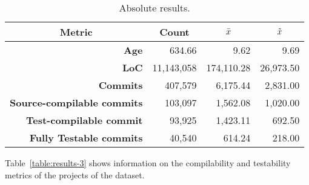 \begin{table}[!htb]
    \centering
    \caption{Absolute results.}
    \label{table:results-1}
    \begin{tabular}{|r|r|r|r|}
        \hline
        \multicolumn{1}{|c|}{\textbf{Metric}}& \multicolumn{1}{c|}{\textbf{Count}} & \multicolumn{1}{c|}{\textbf{\large{$\bar{x}$}}} & \multicolumn{1}{c|}{\textbf{\large{$\tilde{x}$}}} \\ \hline
        \textbf{Age}                      & 634.66                              & 9.62                               & 9.69                                 \\ \hline
        \textbf{LoC}                      & 11,143,058                         & 174,110.28                          & 26,973.50                             \\ \hline
        \textbf{Commits}                  & 407,579                           & 6,175.44                            & 2,831.00                              \\ \hline
        \textbf{Source-compilable commits} & 103,097                           & 1,562.08                            & 1,020.00                              \\ \hline
        \textbf{Test-compilable commit}    & 93,925                            & 1,423.11                            & 692.50                               \\ \hline
        \textbf{Fully Testable commits}   & 40,540                            & 614.24                             & 218.00                               \\ \hline
    \end{tabular}
\end{table}

Table~\ref{table:results-3} shows information on the compilability and testability metrics of the projects of the dataset. 

